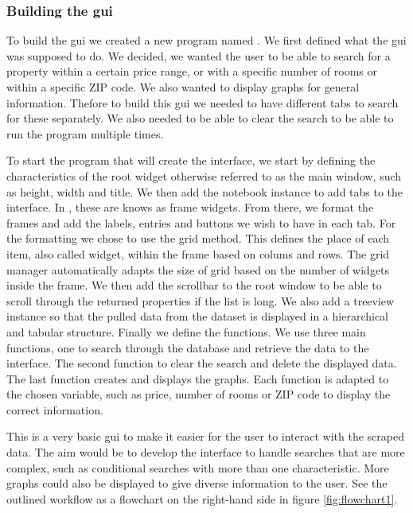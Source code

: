 \documentclass[main]{subfiles}
\begin{document}
\subsubsection{Building the \ac{gui}}
To build the \ac{gui} we created a new program named \pkg[main5.py].
We first defined what the \ac{gui} was supposed to do.
We decided, we wanted the user to be able to search for a property within a certain price range, 
or with a specific number of rooms or within a specific ZIP code. We also wanted to display graphs for general information.
Thefore to build this \ac{gui} we needed to have different tabs to search for these separately.
We also needed to be able to clear the search to be able to run the program multiple times. \par
To start the program that will create the interface, we start by defining the characteristics of the root widget otherwise referred to as the main window,
such as height, width and title. We then add the notebook instance to add tabs to the interface.
In \pkg[tkinter], these are knows as frame widgets. From there, we format the frames and add the labels, entries and buttons we wish to have in each tab. 
For the formatting we chose to use the grid method. This defines the place of each item, also called widget, within the frame based on colums and rows.
The grid manager automatically adapts the size of grid based on the number of widgets inside the frame. 
We then add the scrollbar to the root window to be able to scroll through the returned properties if the list is long. 
We also add a treeview instance so that the pulled data from the dataset is displayed in a hierarchical and tabular structure. 
Finally we define the functions. We use three main functions, one to search through the database and retrieve the data to the interface. 
The second function to clear the search and delete the displayed data. The last function creates and displays the graphs. 
Each function is adapted to the chosen variable, such as price, number of rooms or ZIP code to display the correct information.\par
This is a very basic \ac{gui} to make it easier for the user to interact with the scraped data.
The aim would be to develop the interface to handle searches that are more complex, such as conditional searches with more than one characteristic.
More graphs could also be displayed to give diverse information to the user. 
See the outlined workflow as a flowchart on the right-hand side in figure \ref{fig:flowchart1}.
\end{document}
